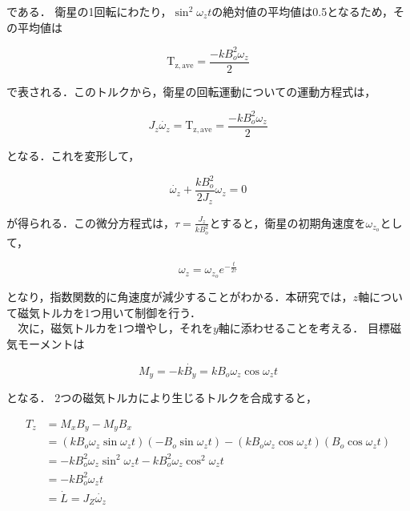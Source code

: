 である．
衛星の1回転にわたり，$\sin^2 \omega_zt$の絶対値の平均値は0.5となるため，その平均値は

\begin{equation}
    \mathrm{T_\mathrm{z,ave}} = \frac{-kB_o^2\omega_z}{2}
\end{equation}

で表される．このトルクから，衛星の回転運動についての運動方程式は，

\begin{equation}
    J_z\dot{\omega_z} = \mathrm{T_\mathrm{z,ave}} = \frac{-kB_o^2\omega_z}{2}
\end{equation}

となる．これを変形して，

\begin{equation}
    \dot{\omega_z}+\frac{kB_o^2}{2J_z}\omega_z = 0
\end{equation}

が得られる．この微分方程式は，$\tau=\frac{J_z}{kB_o^2}$とすると，衛星の初期角速度を$\omega_{z_o}$として，

\begin{equation}
    \omega_z = \omega_{z_o}e^{-\frac{t}{2\tau}} 
\end{equation}

となり，指数関数的に角速度が減少することがわかる．本研究では，$z$軸について磁気トルカを1つ用いて制御を行う．\\
　次に，磁気トルカを1つ増やし，それを$y$軸に添わせることを考える．
目標磁気モーメントは

\begin{equation}
    M_y = -k\dot{B_y} = kB_o\omega_z\cos\omega_zt
\end{equation}

となる．
2つの磁気トルカにより生じるトルクを合成すると，

\begin{equation}
    \begin{aligned}
        T_z &= M_xB_y - M_yB_x\\
            &= (kB_o\omega_z\sin\omega_zt)(-B_o\sin\omega_zt)-(kB_o\omega_z\cos\omega_zt)(B_o\cos\omega_zt)\\
            &= -kB_o^2\omega_z\sin^2\omega_zt - kB_o^2\omega_z\cos^2\omega_zt\\
            &= -kB_o^2\omega_zt\\
            &= \dot{L} = J_Z\dot{\omega_z}
    \end{aligned}
\end{equation}

